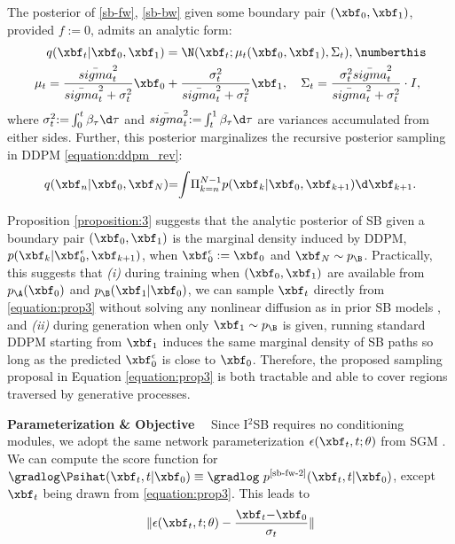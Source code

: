 \begin{proposition} \label{proposition:3}
  The posterior of {\ref{sb-fw}, \ref{sb-bw}} given some boundary pair $(\xbf_0, \xbf_1)$, provided $f := 0$, admits an analytic form:
  \begin{align*}
          & q(\xbf_t|\xbf_0, \xbf_1) = \N(\xbf_t; \mu_t(\xbf_0, \xbf_1), \Sigma_t), \numberthis \label{equation:prop3} \\
    \mu_t & = \frac{\bar{sigma}_t^2}{\bar{sigma}_t^2 + \sigma^2_t} \xbf_0 +
    \frac{\sigma^2_t    }{\bar{sigma}_t^2 + \sigma^2_t} \xbf_1,\quad
    \Sigma_t = \frac{\sigma_t^2 \bar{sigma}_t^2}{\bar{sigma}_t^2 + \sigma^2_t} \cdot I,
  \end{align*}
  where $\sigma^2_t {:=} \int_0^t \beta_\tau \d \tau$ and $\bar{sigma}^2_t {:=} \int_t^1 \beta_\tau \d \tau$ are variances accumulated from either sides.
  Further, this posterior marginalizes the recursive posterior sampling in DDPM \eqref{equation:ddpm_rev}:
  \begin{align*}
    q(\xbf_n|\xbf_0,\xbf_N) {=} {\int} \Pi_{k=n}^{N-1} p(\xbf_{k}|\xbf_0, \xbf_{k{+}1}) \d \xbf_{k{+}1}.
  \end{align*}
\end{proposition}

Proposition \ref{proposition:3} suggests that the analytic posterior of SB given a boundary pair $(\xbf_0, \xbf_1)$
is the marginal density induced by DDPM, $p(\xbf_{k}|\xbf_0^\epsilon, \xbf_{k{+}1})$, when $\xbf_0^\epsilon := \xbf_0$
and $\xbf_N \sim p_\B$.
Practically, this suggests that \textit{(i)} during training when $(\xbf_0, \xbf_1)$ are available from $p_\A(\xbf_0)$ and $p_\B(\xbf_1|\xbf_0)$, we can sample $\xbf_t$ directly from \eqref{equation:prop3} without solving any nonlinear diffusion as in prior SB models \cite{vargas2021solving}, and \textit{(ii)} during generation when only $\xbf_1\sim p_\B$ is given,
running standard DDPM starting from $\xbf_1$ induces the same marginal density of SB paths so long as the predicted $\xbf_0^\epsilon$ is close to $\xbf_0$. %
Therefore, the proposed sampling proposal in Equation \ref{equation:prop3} is both tractable and able to cover regions traversed by generative processes.

\textbf{Parameterization \& Objective$\quad$}
Since I$^2$SB requires no conditioning modules, we adopt the same network parameterization $\epsilon(\xbf_t,t;\theta)$ from SGM \cite{dhariwal2021diffusion}.
We can compute the score function for $\gradlog \Psihat(\xbf_t,t|\xbf_0) \equiv \gradlog~p^\text{\eqref{sb-fw-2}}(\xbf_t,t|\xbf_0)$, except $\xbf_t$ being drawn from \eqref{equation:prop3}.
This leads to
\begin{align} \label{equation:obj}
  \|
  \epsilon(\xbf_t,t; \theta) - \frac{\xbf_t {-} \xbf_0}{\sigma_t}
  \|
\end{align}

